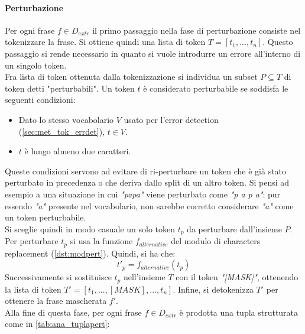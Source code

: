 \paragraph{Perturbazione}
Per ogni frase $f \in D_{extr}$ il primo passaggio nella fase di perturbazione consiste nel tokenizzare la frase. Si ottiene quindi una lista di token $T = [t_1,...,t_n]$. Questo passaggio si rende necessario in quanto si vuole introdurre un errore all'interno di un singolo token.\\
Fra lista di token ottenuta dalla tokenizzazione si individua un subset $P \subseteq T$ di token detti "perturbabili". Un token $t$ è considerato perturbabile se soddisfa le seguenti condizioni:
\begin{itemize}
\item Dato lo stesso vocabolario $V$ usato per l'error detection (\autoref{sec:met_tok_errdet}), $t \in V$.

\item $t$ è lungo almeno due caratteri.
\end{itemize}
Queste condizioni servono ad evitare di ri-perturbare un token che è già stato perturbato in precedenza o che deriva dallo split di un altro token. Si pensi ad esempio a una situazione in cui \textit{"papa"} viene perturbato come \textit{"p a p a"}: pur essendo \textit{"a"} presente nel vocabolario, non sarebbe corretto considerare \textit{"a"} come un token perturbabile.\\
Si sceglie quindi in modo casuale un solo token $t_p$ da perturbare dall'insieme $P$. Per perturbare $t_p$ si usa la funzione $f_{alternative}$ del modulo di characters replacement (\autoref{dst:modpert}). Quindi, si ha che:
\begin{equation}
t\prime_p = f_{alternative}(t_p)
\end{equation}
Successivamente si sostituisce $t_p$ nell'insieme $T$ con il token \textit{"[MASK]"}, ottenendo la lista di token $T\prime = [t_1,...,[MASK],...,t_n]$. Infine, si detokenizza $T\prime$ per ottenere la frase mascherata $f\prime$. \\
Alla fine di questa fase, per ogni frase $f \in D_{extr}$ è prodotta una tupla strutturata come in \autoref{tab:ana_tuplapert}:

